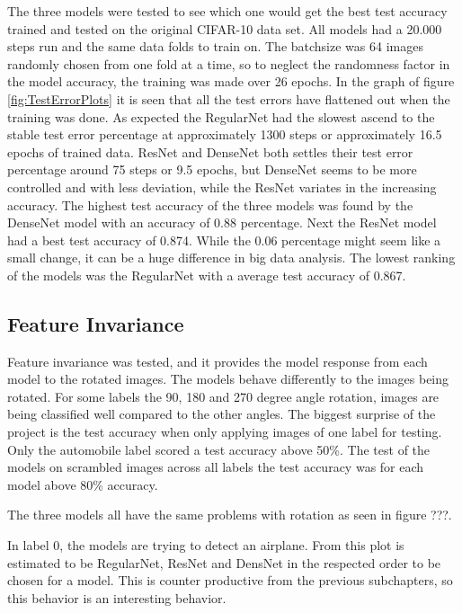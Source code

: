 The three models were tested to see which one would get the best test accuracy trained and tested on the original CIFAR-10 data set. All models had a 20.000 steps run and the same data folds to train on. The batchsize was 64 images randomly chosen from one fold at a time, so to neglect the randomness factor in the model accuracy, the training was made over 26 epochs. In the graph of figure \ref{fig:TestErrorPlots} it is seen that all the test errors have flattened out when the training was done. As expected the RegularNet had the slowest ascend to the stable test error percentage at approximately 1300 steps or approximately 16.5 epochs of trained data. ResNet and DenseNet both settles their test error percentage around 75 steps or 9.5 epochs, but DenseNet seems to be more controlled and with less deviation, while the ResNet variates in the increasing accuracy. The highest test accuracy of the three models was found by the DenseNet model with an accuracy of 0.88 percentage. Next the ResNet model had a best test accuracy of 0.874. While the 0.06 percentage might seem like a small change, it can be a huge difference in big data analysis. The lowest ranking of the models was the RegularNet with a average test accuracy of 0.867.

\subsection{Feature Invariance}

Feature invariance was tested, and it provides the model response from each model to the rotated images. The models behave differently to the images being rotated. For some labels the 90, 180 and 270 degree angle rotation, images are being classified well compared to the other angles. The biggest surprise of the project is the test accuracy when only applying images of one label for testing. Only the automobile label scored a test accuracy above 50\%. The test of the models on scrambled images across all labels the test accuracy was for each model above 80\% accuracy.

The three models all have the same problems with rotation as seen in figure ???.

\FloatBarrier

In label 0, the models are trying to detect an airplane. From this plot is estimated to be RegularNet, ResNet and DensNet in the respected order to be chosen for a model. This is counter productive from the previous subchapters, so this behavior is an interesting behavior.

